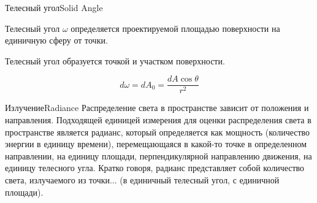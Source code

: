 \documentclass{beamer}
\begin{document}
	\begin{frame}{Телесный угол}{Solid Angle}
		
		Телесный угол $\omega$ определяется проектируемой площадью поверхности на единичную сферу от точки.

		Телесный угол образуется точкой и участком поверхности.

		\[
			d \omega = d A_0 = \frac{d A \cos \theta}{ r^2}
		\]

	\end{frame}



	\begin{frame}{Излучение}{Radiance}
		Распределение света в пространстве зависит от положения и направления. Подходящей единицей измерения для оценки распределения света в пространстве является радианс, который определяется как мощность (количество энергии в единицу времени), перемещающаяся в какой-то точке в определенном направлении, на единицу площади, перпендикулярной направлению движения, на единицу телесного угла. Кратко говоря, радианс представляет собой количество света, излучаемого из точки... (в единичный телесный угол, с единичной площади).



	\end{frame}
\end{document}
